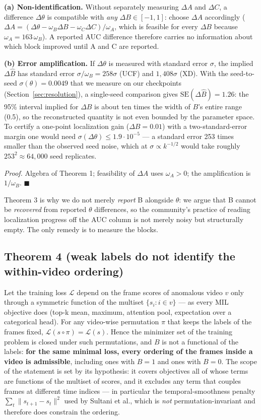 \documentclass[number,preprint,12pt]{elsarticle}
\begin{document}
\textbf{(a) Non-identification.} Without separately measuring \(\Delta A\) and \(\Delta C\), a
difference \(\Delta\theta\) is compatible with \emph{any} \(\Delta B\in[-1,1]\): choose \(\Delta A\) accordingly
(\(\Delta A=(\Delta\theta-\omega_B\Delta B-\omega_C\Delta C)/\omega_A\), which is feasible for every \(\Delta B\) because
\(\omega_A=163\,\omega_B\)). A reported AUC difference therefore carries no information
about which block improved until A and C are reported.

\textbf{(b) Error amplification.} If \(\Delta\theta\) is measured with standard error \(\sigma\), the
implied \(\Delta\hat{B}\) has standard error \(\sigma/\omega_B=258\sigma\) (UCF) and \(1{,}408\sigma\) (XD). With the
seed-to-seed \(\sigma(\theta)=0.0049\) that we measure on our checkpoints (Section~\ref{sec:resolution}),
a single-seed comparison gives \(\mathrm{SE}(\Delta\hat{B})=1.26\): the 95\% interval implied for
\(\Delta B\) is about ten times the width of \(B\)'s entire range (0.5), so the
reconstructed quantity is not even bounded by the parameter space. To certify a
one-point localization gain (\(\Delta B=0.01\)) with a two-standard-error margin one
would need \(\sigma(\Delta\theta)\le 1.9\cdot10^{-5}\) --- a standard error 253 times
smaller than the observed seed noise, which at \(\sigma\propto k^{-1/2}\) would take
roughly \(253^2\approx64{,}000\) seed replicates.

\emph{Proof.} Algebra of Theorem 1; feasibility of \(\Delta A\) uses \(\omega_A>0\); the
amplification is \(1/\omega_B\). \(\blacksquare\)

Theorem 3 is why we do not merely \emph{report} B alongside \(\theta\): we argue that B cannot
be \emph{recovered} from reported \(\theta\) differences, so the community's practice of
reading localization progress off the AUC column is not merely noisy but
structurally empty. The only remedy is to measure the blocks.

\subsection{Theorem 4 (weak labels do not identify the within-video ordering)}\label{sec:thm4}

Let the training loss \(\mathcal{L}\) depend on the frame scores of anomalous video \(v\) only
through a symmetric function of the multiset \(\{s_i: i\in v\}\) --- as every MIL
objective does (top-k mean, maximum, attention pool, expectation over a
categorical head). For any video-wise permutation \(\pi\) that keeps the labels of
the frames fixed, \(\mathcal{L}(s\circ\pi)=\mathcal{L}(s)\). Hence the minimizer set of the training
problem is closed under such permutations, and \(B\) is not a functional of the
labels: \textbf{for the same minimal loss, every ordering of the frames inside a video
is admissible}, including ones with \(B=1\) and ones with \(B=0\). The scope of the
statement is set by its hypothesis: it covers objectives all of whose terms are
functions of the multiset of scores, and it excludes any term that couples frames
at different time indices --- in particular the temporal-smoothness penalty
\(\sum_t\lVert s_{t+1}-s_t\rVert^{2}\) used by Sultani et al., which is \emph{not}
permutation-invariant and therefore does constrain the ordering.
\end{document}
